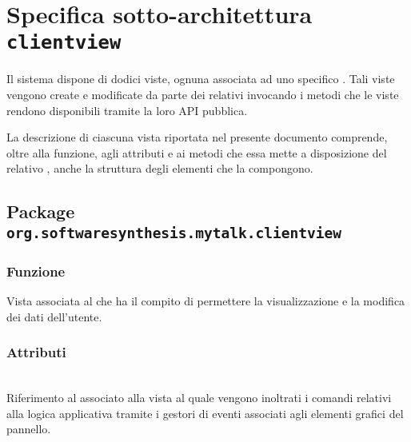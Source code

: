 \clearpage

\section{Specifica sotto-architettura \texttt{clientview}}\label{sec:clientviewarchitecture}
Il sistema dispone di dodici viste, ognuna associata ad uno specifico . Tali viste vengono create e modificate da parte dei relativi  invocando i metodi che le viste rendono disponibili tramite la loro API pubblica.

La descrizione di ciascuna vista riportata nel presente documento comprende, oltre alla funzione, agli attributi e ai metodi che essa mette a disposizione del relativo , anche la struttura degli elementi che la compongono.

\subsection{Package \texttt{org.softwaresynthesis.mytalk.clientview}}

\subsubsection*{Funzione}
Vista associata al   che ha il compito di permettere la visualizzazione e la modifica dei dati dell'utente.

\subsubsection*{Attributi}
\begin{description}
  \item{}\\
  Riferimento al  associato alla vista al quale vengono inoltrati i comandi relativi alla logica applicativa tramite i gestori di eventi associati agli elementi grafici del pannello.
\end{description}

